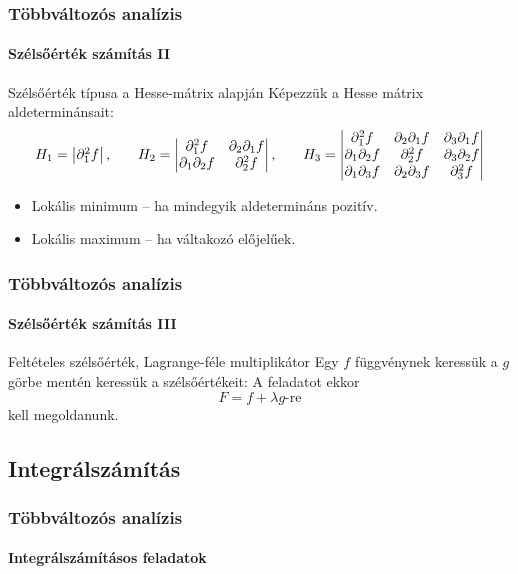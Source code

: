 \begin{frame}
  \frametitle{Többváltozós analízis}
  \framesubtitle{Szélsőérték számítás II}

  \begin{block}{Szélsőérték típusa a Hesse-mátrix alapján}
    Képezzük a Hesse mátrix aldeterminánsait:
    \def\arraystretch{1.25}
    \[
      H_1 = \begin{vmatrix}
        \partial^2_1 f
      \end{vmatrix}
      \text,
      \mathbf{\qquad}
      H_2 = \begin{vmatrix}
        \partial^2_1 f          & \partial_2 \partial_1 f \\
        \partial_1 \partial_2 f & \partial^2_2 f
      \end{vmatrix}
      \text,
      \qquad
      H_3 = \begin{vmatrix}
        \partial^2_1 f          & \partial_2 \partial_1 f & \partial_3 \partial_1 f \\
        \partial_1 \partial_2 f & \partial^2_2 f          & \partial_3 \partial_2 f \\
        \partial_1 \partial_3 f & \partial_2 \partial_3 f & \partial^2_3 f
      \end{vmatrix}
    \]

    \begin{itemize}
      \item Lokális minimum -- ha mindegyik aldetermináns pozitív.
      \item Lokális maximum -- ha váltakozó előjelűek. %
    \end{itemize}
  \end{block}

  
\end{frame}

\begin{frame}
  \frametitle{Többváltozós analízis}
  \framesubtitle{Szélsőérték számítás III}

  \begin{block}{Feltételes szélsőérték, Lagrange-féle multiplikátor}
    Egy $f$ függvénynek keressük a $g$ görbe mentén keressük a szélsőértékeit:
    A feladatot ekkor
    \[
      F = f + \lambda g\text{-re}
    \]
    kell megoldanunk.
  \end{block}

  
\end{frame}

%

\subsection{Integrálszámítás}

\begin{frame}
  \frametitle{Többváltozós analízis}
  \framesubtitle{Integrálszámításos feladatok}

  
  
\end{frame}
